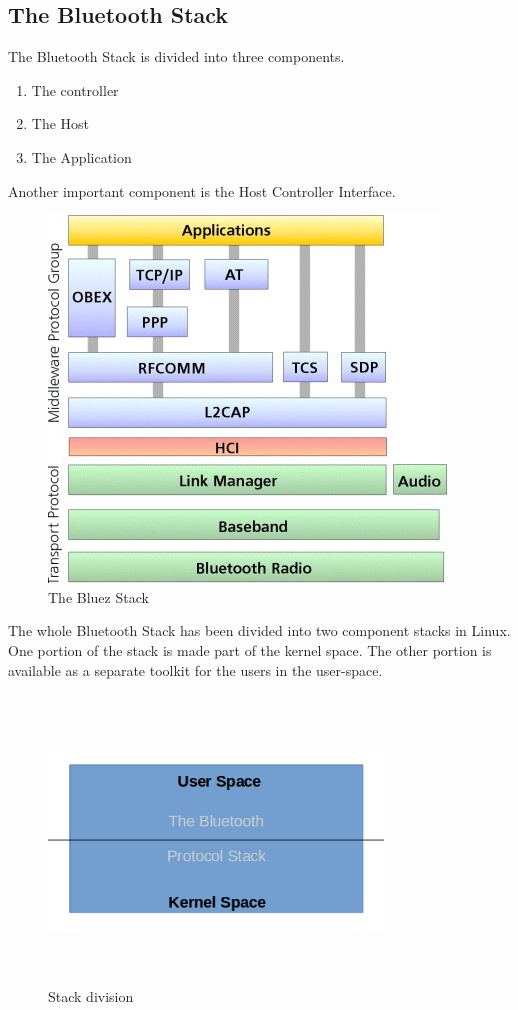 \subsection{The Bluetooth Stack}
The Bluetooth Stack is divided into three components.
\begin{enumerate}
	\item The controller
	\item The Host
	\item The Application
\end{enumerate}
Another important component is the Host Controller Interface.
\begin{figure}[ht]
	\centering
	\includegraphics[scale=0.5]{images/bluetooth_stack.png}
	\caption{The Bluez Stack}
\end{figure}
The whole Bluetooth Stack has been divided into two component stacks in Linux. One portion of the stack is made part of the kernel space. The other portion is available as a separate toolkit for the users in the user-space.
\begin{figure}[ht]
	\centering
	\includegraphics[width=3.5in, height=3in]{images/kernel_userspace.png}
	\caption{Stack division}
\end{figure}
